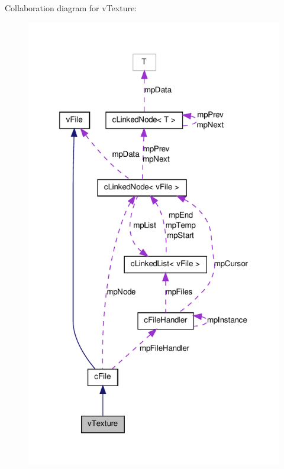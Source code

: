 Collaboration diagram for vTexture:
\nopagebreak
\begin{figure}[H]
\begin{center}
\leavevmode
\includegraphics[width=320pt]{classv_texture__coll__graph}
\end{center}
\end{figure}
